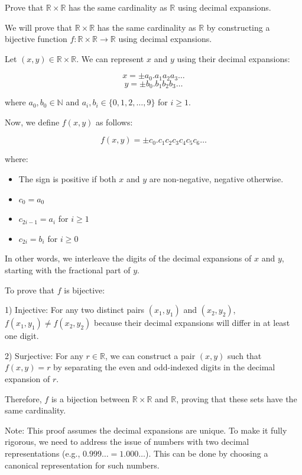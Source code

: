 \begin{exercise}
Prove that $\mathbb{R} \times \mathbb{R}$ has the same cardinality as $\mathbb{R}$ using decimal expansions.
\end{exercise}

\begin{solution}
We will prove that $\mathbb{R} \times \mathbb{R}$ has the same cardinality as $\mathbb{R}$ by constructing a bijective function $f: \mathbb{R} \times \mathbb{R} \to \mathbb{R}$ using decimal expansions.

Let $(x, y) \in \mathbb{R} \times \mathbb{R}$. We can represent $x$ and $y$ using their decimal expansions:

\[
x = \pm a_0.a_1a_2a_3\ldots
\]
\[
y = \pm b_0.b_1b_2b_3\ldots
\]

where $a_0, b_0 \in \mathbb{N}$ and $a_i, b_i \in \{0, 1, 2, \ldots, 9\}$ for $i \geq 1$.

Now, we define $f(x, y)$ as follows:

\[
f(x, y) = \pm c_0.c_1c_2c_3c_4c_5c_6\ldots
\]

where:
\begin{itemize}
    \item The sign is positive if both $x$ and $y$ are non-negative, negative otherwise.
    \item $c_0 = a_0$
    \item $c_{2i-1} = a_i$ for $i \geq 1$
    \item $c_{2i} = b_i$ for $i \geq 0$
\end{itemize}

In other words, we interleave the digits of the decimal expansions of $x$ and $y$, starting with the fractional part of $y$.

To prove that $f$ is bijective:

1) Injective: For any two distinct pairs $(x_1, y_1)$ and $(x_2, y_2)$, $f(x_1, y_1) \neq f(x_2, y_2)$ because their decimal expansions will differ in at least one digit.

2) Surjective: For any $r \in \mathbb{R}$, we can construct a pair $(x, y)$ such that $f(x, y) = r$ by separating the even and odd-indexed digits in the decimal expansion of $r$.

Therefore, $f$ is a bijection between $\mathbb{R} \times \mathbb{R}$ and $\mathbb{R}$, proving that these sets have the same cardinality.

Note: This proof assumes the decimal expansions are unique. To make it fully rigorous, we need to address the issue of numbers with two decimal representations (e.g., $0.999\ldots = 1.000\ldots$). This can be done by choosing a canonical representation for such numbers.
\end{solution}


